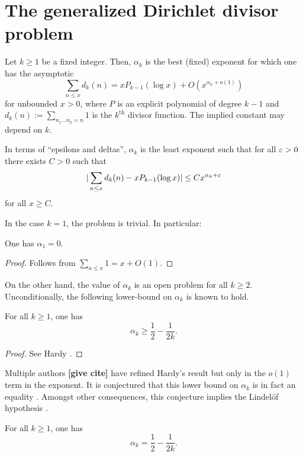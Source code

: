 \chapter{The generalized Dirichlet divisor problem}

\begin{definition}\label{divisor-def} Let $k \geq 1$ be a fixed integer. Then, $\alpha_k$ is the best (fixed) exponent for which one has the asymptotic
$$ \sum_{n \leq x} d_k(n) = x P_{k-1}(\log x) + O(x^{\alpha_k+o(1)})$$
for unbounded $x > 0$, where $P$ is an explicit polynomial of degree $k-1$ and $d_k(n) := \sum_{n_1 \dots n_k=n} 1$ is the $k^{\mathrm{th}}$ divisor function. The implied constant may depend on $k$.
\end{definition}


In terms of ``epsilons and deltas'', $\alpha_k$ is the least exponent such that for all $\varepsilon > 0$ there exists $C > 0$ such that
$$ |\sum_{n \leq x} d_k(n) - x P_{k-1}(\log x)| \leq C x^{\alpha_k + \varepsilon}$$
for all $x \geq C$.

In the case $k = 1$, the problem is trivial. In particular:

\begin{lemma}[$d_1$ exponent]\label{divisor-1} One has $\alpha_1=0$.
\end{lemma}
\begin{proof}
Follows from $\sum_{n \le x}1 = x + O(1)$.
\end{proof}

On the other hand, the value of $\alpha_k$ is an open problem for all $k \ge 2$. Unconditionally, the following lower-bound on $\alpha_k$ is known to hold.

\begin{lemma}\label{divisor-lower}
For all $k \geq 1$, one has
\[
\alpha_k \geq \frac{1}{2} - \frac{1}{2k}.
\]
\end{lemma}
\begin{proof} See Hardy \cite{hardy_divisor_1916}.
\end{proof}

Multiple authors {\bf [give cite]} have refined Hardy's result but only in the $o(1)$ term in the exponent. It is conjectured that this lower bound on $\alpha_k$ is in fact an equality \cite[p.\ 320]{titchmarsh_theory_1986}. Amongst other consequences, this conjecture implies the Lindel\"of hypothesis \cite[Chapter XII]{titchmarsh_theory_1986}.
\begin{conjecture}
For all $k \geq 1$, one has
\[
\alpha_k = \frac{1}{2} - \frac{1}{2k}.
\]
\end{conjecture}

